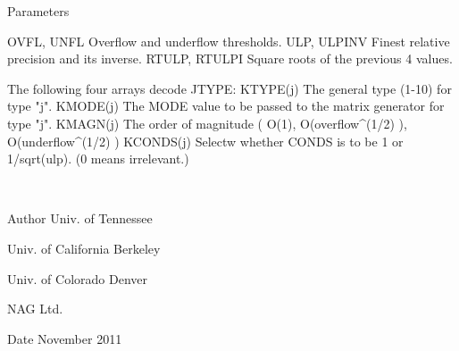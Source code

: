 \begin{DoxyParams}[1]{Parameters}
\begin{DoxyVerb}
     OVFL, UNFL      Overflow and underflow thresholds.
     ULP, ULPINV     Finest relative precision and its inverse.
     RTULP, RTULPI   Square roots of the previous 4 values.

             The following four arrays decode JTYPE:
     KTYPE(j)        The general type (1-10) for type "j".
     KMODE(j)        The MODE value to be passed to the matrix
                     generator for type "j".
     KMAGN(j)        The order of magnitude ( O(1),
                     O(overflow^(1/2) ), O(underflow^(1/2) )
     KCONDS(j)       Selectw whether CONDS is to be 1 or
                     1/sqrt(ulp).  (0 means irrelevant.)\end{DoxyVerb}
 \\
\hline
\end{DoxyParams}
\begin{DoxyAuthor}{Author}
Univ. of Tennessee 

Univ. of California Berkeley 

Univ. of Colorado Denver 

N\+A\+G Ltd. 
\end{DoxyAuthor}
\begin{DoxyDate}{Date}
November 2011 
\end{DoxyDate}
\hypertarget{group__double__eig_gaf88edcce9dcbf23eda454e31d1b422db}{}
